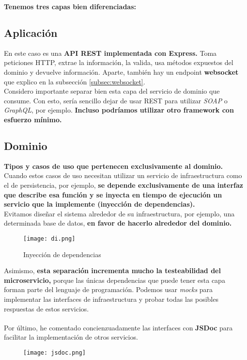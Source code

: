 \textbf{Tenemos tres capas bien diferenciadas:}


\subsection{Aplicación}
En este caso es una \textbf{API REST implementada con Express.} Toma peticiones HTTP, extrae la información, la valida, usa métodos expuestos del dominio y devuelve información.
Aparte, también hay un endpoint \textbf{websocket} que explico en la subsección \ref{subsec:websocket}. \\
Considero importante separar bien esta capa del servicio de dominio que consume. Con esto, sería sencillo dejar de usar 
REST para utilizar \textit{SOAP} o \textit{GraphQL}, por ejemplo. \textbf{Incluso podríamos utilizar otro framework con esfuerzo mínimo.}

\subsection{Dominio}
\textbf{Tipos y casos de uso que pertenecen exclusivamente al dominio.}
Cuando estos casos de uso necesitan utilizar un servicio de infraestructura como el de persistencia, por ejemplo,
\textbf{se depende exclusivamente de una interfaz que describe esa función y se inyecta en tiempo de ejecución un servicio que la implemente (inyección de dependencias).}
\\Evitamos diseñar el sistema alrededor de su infraestructura, por ejemplo, una determinada base de datos, \textbf{en favor de hacerlo alrededor del dominio.}
\begin{figure}[H]
	\centering	
	\texttt{[image: di.png]}
	\caption{Inyección de dependencias}
	\end{figure}

Asimismo, \textbf{esta separación incrementa mucho la testeabilidad del microservicio,} porque las únicas dependencias
que puede tener esta capa forman parte del lenguaje de programación. Podemos usar \textit{mocks} para implementar
las interfaces de infraestructura y probar todas las posibles respuestas de estos servicios. \\ \\
Por último, he comentado concienzuadamente las interfaces con \textbf{JSDoc} \cite{jsdoc} para facilitar la implementación de otros servicios.
\begin{figure}[H]
	\centering	
	\texttt{[image: jsdoc.png]}
	\end{figure}

